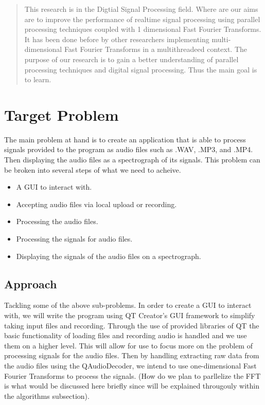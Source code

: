 \documentclass[12pt]{article}
\begin{document}
\maketitle

\begin{abstract}
This research is in the Digtial Signal Processing field. Where are our aims are to improve the performance of realtime
 signal processing using parallel processing techniques coupled with 1 dimensional Fast Fourier Transforms.
 It has been done before by other researchers implementing multi-dimensional Fast Fourier Transforms in a
 multithreadeed context. The purpose of our research is to gain a better understanding of parallel processing
 techniques and digital signal processing. Thus the main goal is to learn.
\end{abstract}

\section{Target Problem}
The main problem at hand is to create an application that is able to process signals provided to the program as audio 
files such as .WAV, .MP3, and .MP4. Then displaying the audio files as a spectrograph of its signals. This problem 
can be broken into several steps of what we need to acheive.
\begin{itemize}
	\item A GUI to interact with.
	\item Accepting audio files via local upload or recording.
	\item Processing the audio files.
	\item Processing the signals for audio files.
	\item Displaying the signals of the audio files on a spectrograph.
\end{itemize}

\subsection{Approach}
Tackling some of the above sub-problems. In order to create a GUI to interact with, we will write the program using 
QT Creator's GUI framework to simplify taking input files and recording. Through the use of provided libraries of QT 
the basic functionality of loading files and recording audio is handled and we use them on a higher level. This will 
allow for use to focus more on the problem of processing signals for the audio files. Then by handling extracting 
raw data from the audio files using the QAudioDecoder, we intend to use one-dimensional Fast Fourier Transforms to 
process the signals. (How do we plan to parllelize the FFT is what would be discussed here briefly since will be 
explained througouly within the algorithms subsection).
\end{document}
